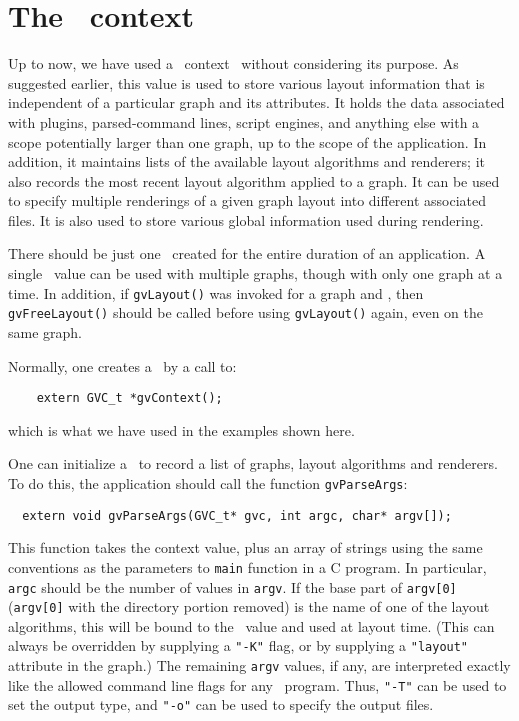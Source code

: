\section{The \gviz\ context}
\label{sec:gvc}

Up to now, we have used a \gviz\ context \gvc\ without
considering its purpose. As suggested earlier, this value is used
to store various layout information that is independent of a particular
graph and its attributes. 
It holds the data associated with plugins, parsed-command lines, 
script engines, and anything else with a scope potentially larger 
than one graph, up to the scope of the application.
In addition, it maintains lists of the
available layout algorithms and renderers; it also records the most recent
layout algorithm applied to a graph. It can be used to specify multiple
renderings of a given graph layout into different associated files.
It is also used to store various global information used during
rendering.

There should be just one \gvc\ created for the entire 
duration of an application.
A single \gvc\ value can be used with multiple graphs, though
with only one graph at a time. In addition, if {\tt gvLayout()}
was invoked for a graph and \gvc, then {\tt gvFreeLayout()} should
be called before using {\tt gvLayout()} again, even on the same graph.
 
Normally, one creates a \gvc\ by a call to:
\begin{verbatim}
    extern GVC_t *gvContext();
\end{verbatim}
which is what we have used in the examples shown here.

One can initialize a \gvc\ to record a list of graphs, layout algorithms
and renderers. To do this, the application should
call the function {\tt gvParseArgs}:
\begin{verbatim}
  extern void gvParseArgs(GVC_t* gvc, int argc, char* argv[]);
\end{verbatim}
This function takes the context value, plus an array of strings
using the same conventions as the parameters to {\tt main} function
in a C program. In particular, {\tt argc} should be the number of
values in {\tt argv}. If the base part of {\tt argv[0]} ({\tt argv[0]} with the
directory portion removed) is the name of one of the
layout algorithms, this will be bound to the \gvc\ value and used
at layout time.
(This can always be overridden by supplying a {\tt "-K"} flag, or by
supplying a {\tt "layout"} attribute in the graph.)
The remaining {\tt argv} values, if any, are interpreted exactly like
the allowed command line flags for any \gviz\ program.
Thus, {\tt "-T"} can be used to set the output type, and {\tt "-o"}
can be used to specify the output files.

